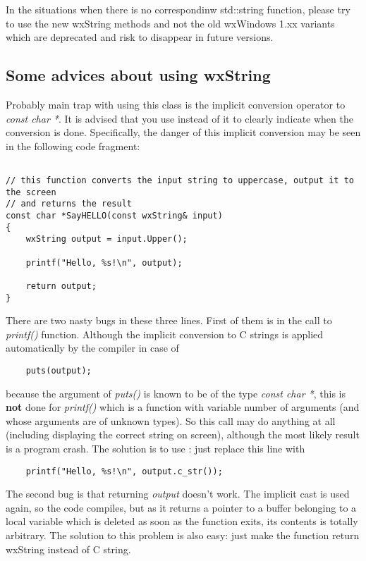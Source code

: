 In the situations when there is no correspondinw std::string function, please
try to use the new wxString methods and not the old wxWindows 1.xx variants
which are deprecated and risk to disappear in future versions.

\subsection{Some advices about using wxString}\label{wxstringadvices}

Probably main trap with using this class is the implicit conversion operator to
{\it const char *}. It is advised that you use 
instead of it to clearly indicate when the conversion is done. Specifically, the
danger of this implicit conversion may be seen in the following code fragment:

\begin{verbatim}

// this function converts the input string to uppercase, output it to the screen
// and returns the result
const char *SayHELLO(const wxString& input)
{
    wxString output = input.Upper();

    printf("Hello, %s!\n", output);

    return output;
}

\end{verbatim}

There are two nasty bugs in these three lines. First of them is in the call to
{\it printf()} function. Although the implicit conversion to C strings is applied
automatically by the compiler in case of

\begin{verbatim}
    puts(output);
\end{verbatim}

because the argument of {\it puts()} is known to be of the type {\it const char
*}, this is {\bf not} done for {\it printf()} which is a function with variable
number of arguments (and whose arguments are of unknown types). So this call may
do anything at all (including displaying the correct string on screen), although
the most likely result is a program crash. The solution is to use 
: just replace this line with

\begin{verbatim}
    printf("Hello, %s!\n", output.c_str());
\end{verbatim}

The second bug is that returning {\it output} doesn't work. The implicit cast is
used again, so the code compiles, but as it returns a pointer to a buffer
belonging to a local variable which is deleted as soon as the function exits,
its contents is totally arbitrary. The solution to this problem is also easy:
just make the function return wxString instead of C string.

